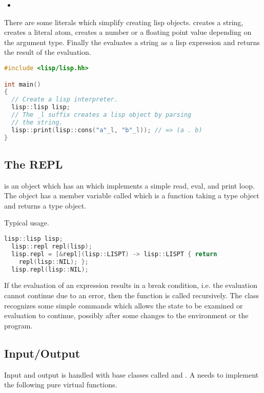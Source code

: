 \begin{itemize}
  \item {}
\end{itemize}

There are some literals which simplify creating lisp
objects.  creates a string, 
creates a literal atom,  creates a number or a
floating point value depending on the argument type. Finally the
 evaluates a string as a lisp expression and returns
the result of the evaluation.

\begin{lstlisting}[language=c++]
#include <lisp/lisp.hh>

int main()
{
  // Create a lisp interpreter.
  lisp::lisp lisp;
  // The _l suffix creates a lisp object by parsing
  // the string.
  lisp::print(lisp::cons("a"_l, "b"_l)); // => (a . b)
}
\end{lstlisting}
\subsection{The REPL}
 is an object which has an  which implements a simple read, eval, and print
loop.  The  object has a member variable called
 which is a function taking a  type object and
returns a  type object.

Typical usage.

\begin{lstlisting}[language=c++]
  lisp::lisp lisp;
  lisp::repl repl(lisp);
  lisp.repl = [&repl](lisp::LISPT) -> lisp::LISPT { return
    repl(lisp::NIL); };
  lisp.repl(lisp::NIL);
\end{lstlisting}

If the evaluation of an expression results in a break condition,
i.e. the evaluation cannot continue due to an error, then the
 function is called recursively. The
 class recognizes some simple commands which allows
the state to be examined or evaluation to continue, possibly after
some changes to the environment or the program.

\subsection{Input/Output}
Input and output is handled with base classes called  and
. A  needs to implement the following pure
virtual functions.

